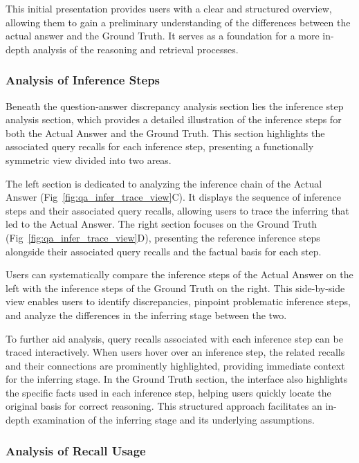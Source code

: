 This initial presentation provides users with a clear and structured overview, allowing them to gain a preliminary understanding of the differences between the actual answer and the Ground Truth. It serves as a foundation for a more in-depth analysis of the reasoning and retrieval processes.

\subsubsection{Analysis of Inference Steps}

Beneath the question-answer discrepancy analysis section lies the inference step analysis section, which provides a detailed illustration of the inference steps for both the Actual Answer and the Ground Truth. This section highlights the associated query recalls for each inference step, presenting a functionally symmetric view divided into two areas.

The left section is dedicated to analyzing the inference chain of the Actual Answer (Fig~\ref{fig:qa_infer_trace_view}C). It displays the sequence of inference steps and their associated query recalls, allowing users to trace the inferring that led to the Actual Answer. The right section focuses on the Ground Truth (Fig~\ref{fig:qa_infer_trace_view}D), presenting the reference inference steps alongside their associated query recalls and the factual basis for each step.

Users can systematically compare the inference steps of the Actual Answer on the left with the inference steps of the Ground Truth on the right. This side-by-side view enables users to identify discrepancies, pinpoint problematic inference steps, and analyze the differences in the inferring stage between the two.

To further aid analysis, query recalls associated with each inference step can be traced interactively. When users hover over an inference step, the related recalls and their connections are prominently highlighted, providing immediate context for the inferring stage. In the Ground Truth section, the interface also highlights the specific facts used in each inference step, helping users quickly locate the original basis for correct reasoning. This structured approach facilitates an in-depth examination of the inferring stage and its underlying assumptions.

\subsubsection{Analysis of Recall Usage}


